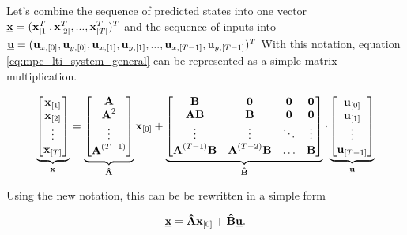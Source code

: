 \documentclass{article}
\begin{document}
Let's combine the sequence of predicted states into one vector $\textbf{\underline{x}} = (\textbf{x}_{[1]}^T, \textbf{x}_{[2]}^T, ..., \textbf{x}_{[T]}^T)^T$ and the sequence of inputs into 
$\textbf{\underline{u}} = (\textbf{u}_{x,[0]}, \textbf{u}_{y,[0]}, \textbf{u}_{x,[1]}, \textbf{u}_{y,[1]}, ..., \textbf{u}_{x,[T-1]}, \textbf{u}_{y,[T-1]})^T$
With this notation, equation \ref{eq:mpc_lti_system_general} can be represented as a simple matrix multiplication.

\begin{equation}
\label{eq:prediction_big}
\underbrace{
\begin{bmatrix}
\textbf{x}_{[1]} \\
\textbf{x}_{[2]} \\
\vdots \\
\textbf{x}_{[T]} \\
\end{bmatrix}}_{\textbf{\underline{x}}}
=
\underbrace{
\begin{bmatrix}
\textbf{A} \\
\textbf{A}^2 \\
\vdots \\
\textbf{A}^{(T-1)} \\
\end{bmatrix}}_{\textbf{\^A}}
\textbf{x}_{[0]}
+
\underbrace{
\begin{bmatrix}
\textbf{B} & \textbf{0} & \textbf{0} & \textbf{0} \\
\textbf{AB} & \textbf{B} & \textbf{0} & \textbf{0} \\
\vdots & \vdots & \ddots & \vdots \\
\textbf{A}^{(T-1)}\textbf{B} & \textbf{A}^{(T-2)}\textbf{B} & \hdots & \textbf{B}
\end{bmatrix}
}_{\textbf{\^B}}
\cdot
\underbrace{
\begin{bmatrix}
\textbf{u}_{[0]} \\
\textbf{u}_{[1]} \\
\vdots \\
\textbf{u}_{[T-1]} \\
\end{bmatrix}}_{\textbf{\underline{u}}}
\end{equation}

Using the new notation, this can be be rewritten in a simple form

\begin{equation}
\label{eq:prediction_final}
\textbf{\underline{x}} = \textbf{\^A}\textbf{x}_{[0]} + \textbf{\^B}\textbf{\underline{u}}.
\end{equation}
\end{document}

